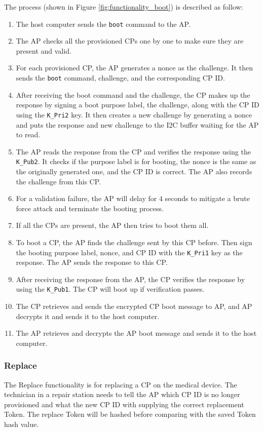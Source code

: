 \documentclass[11pt,oneside,onecolumn,letterpaper]{article}
\begin{document}
	The process (shown in Figure \ref{fig:functionality_boot}) is described as follow:
	\begin{enumerate}
		\item The host computer sends the \texttt{boot} command to the AP.
		\item The AP checks all the provisioned CPs one by one to make sure they are present and valid.
		\item For each provisioned CP,
		the AP generates a nonce as the challenge.
		It then sends the \texttt{boot} command,
		challenge,
		and the corresponding CP ID.
		\item After receiving the boot command and the challenge,
		the CP makes up the response by signing a boot purpose label,
		the challenge,
		along with the CP ID using the \texttt{K\_Pri2} key.
		It then creates a new challenge by generating a nonce and puts the response and new challenge to the I2C buffer waiting for the AP to read.
		\item The AP reads the response from the CP and verifies the response using the \texttt{K\_Pub2}.
		It checks if the purpose label is for booting,
		the nonce is the same as the originally generated one,
		and the CP ID is correct.
		The AP also records the challenge from this CP.
		\item For a validation failure,
		the AP will delay for 4 seconds to mitigate a brute force attack and terminate the booting process.
		\item If all the CPs are present,
		the AP then tries to boot them all.
		\item To boot a CP,
		the AP finds the challenge sent by this CP before.
		Then sign the booting purpose label, nonce, and CP ID with the \texttt{K\_Pri1} key as the response.
		The AP sends the response to this CP.
		\item After receiving the response from the AP,
		the CP verifies the response by using the \texttt{K\_Pub1}.
		The CP will boot up if verification passes.
		\item The CP retrieves and sends the encrypted CP boot message to AP, and AP decrypts it and sends it to the host computer.
		\item The AP retrieves and decrypts the AP boot message and sends it to the host computer.
	\end{enumerate}
	
	\subsubsection{Replace}
	The Replace functionality is for replacing a CP on the medical device.
	The technician in a repair station needs to tell the AP which CP ID is no longer provisioned and what the new CP ID with supplying the correct replacement Token.
	The replace Token will be hashed before comparing with the saved Token hash value.
	
\end{document}
